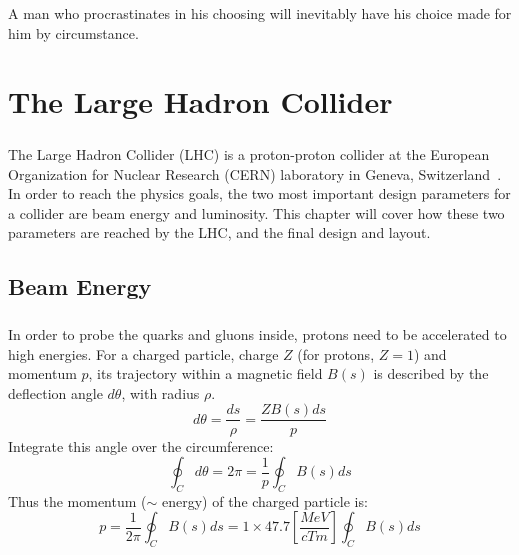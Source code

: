 \begin{savequote}[75mm]
A man who procrastinates in his choosing will inevitably have his choice made for him by circumstance.
\end{savequote}

\chapter{The Large Hadron Collider}

\paragraph{}
The Large Hadron Collider (LHC) is a proton-proton collider at the European Organization for Nuclear Research (CERN) laboratory in Geneva, Switzerland~\cite{LHCPaper}. In order to reach the physics goals, the two most important design parameters for a collider are beam energy and luminosity. This chapter will cover how these two parameters are reached by the LHC, and the final design and layout.

\section{Beam Energy}
\paragraph{}
In order to probe the quarks and gluons inside, protons need to be accelerated to high energies. For a charged particle, charge $Z$ (for protons, $Z=1$) and momentum $p$, its trajectory within a magnetic field $B(s)$ is described by the deflection angle $d\theta$, with radius $\rho$.
%
\begin{equation}
d\theta = \frac{ds}{\rho} = \frac{ZB(s)ds}{p}
\end{equation}
Integrate this angle over the circumference:
\begin{equation}
\oint_C d\theta = 2\pi = \frac{1}{p} \oint_C B(s)ds
\end{equation}
Thus the momentum ($\sim$ energy) of the charged particle is:
\begin{equation}
\label{Ch2:eq-p}
p = \frac{1}{2\pi}\oint_C B(s)ds = 1 \times 47.7[\frac{MeV}{cTm}] \oint_C B(s)ds
\end{equation}
%
